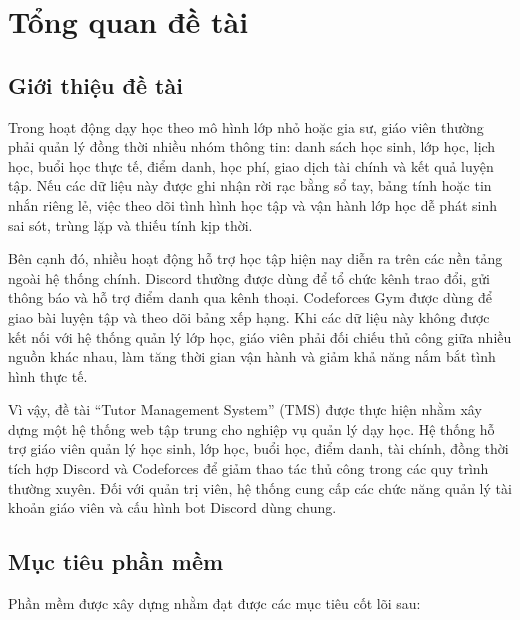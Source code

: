 \documentclass[12pt,a4paper]{article}
\begin{document}
\tableofcontents
\newpage

\section{Tổng quan đề tài}

\subsection{Giới thiệu đề tài}

Trong hoạt động dạy học theo mô hình lớp nhỏ hoặc gia sư, giáo viên thường phải
quản lý đồng thời nhiều nhóm thông tin: danh sách học sinh, lớp học, lịch học,
buổi học thực tế, điểm danh, học phí, giao dịch tài chính và kết quả luyện tập.
Nếu các dữ liệu này được ghi nhận rời rạc bằng sổ tay, bảng tính hoặc tin nhắn
riêng lẻ, việc theo dõi tình hình học tập và vận hành lớp học dễ phát sinh sai
sót, trùng lặp và thiếu tính kịp thời.

Bên cạnh đó, nhiều hoạt động hỗ trợ học tập hiện nay diễn ra trên các nền tảng
ngoài hệ thống chính. Discord thường được dùng để tổ chức kênh trao đổi, gửi
thông báo và hỗ trợ điểm danh qua kênh thoại. Codeforces Gym được dùng để
giao bài luyện tập và theo dõi bảng xếp hạng. Khi các dữ liệu này không được
kết nối với hệ thống quản lý lớp học, giáo viên phải đối chiếu thủ công giữa
nhiều nguồn khác nhau, làm tăng thời gian vận hành và giảm khả năng nắm bắt
tình hình thực tế.

Vì vậy, đề tài ``Tutor Management System'' (TMS) được thực hiện nhằm xây dựng
một hệ thống web tập trung cho nghiệp vụ quản lý dạy học. Hệ thống hỗ trợ giáo
viên quản lý học sinh, lớp học, buổi học, điểm danh, tài chính, đồng thời tích
hợp Discord và Codeforces để giảm thao tác thủ công trong các quy trình thường
xuyên. Đối với quản trị viên, hệ thống cung cấp các chức năng quản lý tài khoản
giáo viên và cấu hình bot Discord dùng chung.

\subsection{Mục tiêu phần mềm}

Phần mềm được xây dựng nhằm đạt được các mục tiêu cốt lõi sau:
\end{document}
